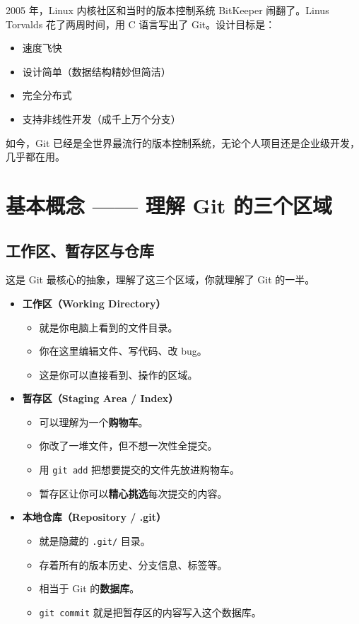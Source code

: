 \documentclass[12pt,a4paper]{article}
\begin{document}
2005 年，Linux 内核社区和当时的版本控制系统 BitKeeper 闹翻了。Linus Torvalds 花了两周时间，用 C 语言写出了 Git。设计目标是：
\begin{itemize}[itemsep=3pt]
    \item 速度飞快
    \item 设计简单（数据结构精妙但简洁）
    \item 完全分布式
    \item 支持非线性开发（成千上万个分支）
\end{itemize}

如今，Git 已经是全世界最流行的版本控制系统，无论个人项目还是企业级开发，几乎都在用。

\section{基本概念 —— 理解 Git 的三个区域}

\subsection{工作区、暂存区与仓库}

这是 Git 最核心的抽象，理解了这三个区域，你就理解了 Git 的一半。

\begin{itemize}[itemsep=5pt]
    \item \textbf{工作区（Working Directory）}
    \begin{itemize}
        \item 就是你电脑上看到的文件目录。
        \item 你在这里编辑文件、写代码、改 bug。
        \item 这是你可以直接看到、操作的区域。
    \end{itemize}

    \item \textbf{暂存区（Staging Area / Index）}
    \begin{itemize}
        \item 可以理解为一个\textbf{购物车}。
        \item 你改了一堆文件，但不想一次性全提交。
        \item 用 \texttt{git add} 把想要提交的文件先放进购物车。
        \item 暂存区让你可以\textbf{精心挑选}每次提交的内容。
    \end{itemize}

    \item \textbf{本地仓库（Repository / .git）}
    \begin{itemize}
        \item 就是隐藏的 \texttt{.git/} 目录。
        \item 存着所有的版本历史、分支信息、标签等。
        \item 相当于 Git 的\textbf{数据库}。
        \item \texttt{git commit} 就是把暂存区的内容写入这个数据库。
    \end{itemize}
\end{itemize}
\end{document}
